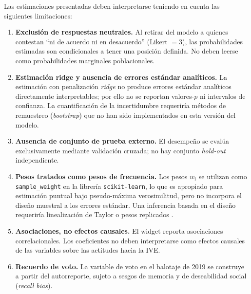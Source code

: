 \documentclass[11pt,a4paper]{article}
\begin{document}
Las estimaciones presentadas deben interpretarse teniendo en cuenta las siguientes limitaciones:
\begin{enumerate}
\setlength{\itemsep}{2pt}
\item \textbf{Exclusión de respuestas neutrales.} Al retirar del modelo a quienes contestan ``ni de acuerdo ni en desacuerdo'' (Likert $= 3$), las probabilidades estimadas son condicionales a tener una posición definida. No deben leerse como probabilidades marginales poblacionales.

\item \textbf{Estimación ridge y ausencia de errores estándar analíticos.} La estimación con penalización \emph{ridge} no produce errores estándar analíticos directamente interpretables; por ello no se reportan valores-$p$ ni intervalos de confianza. La cuantificación de la incertidumbre requeriría métodos de remuestreo (\emph{bootstrap}) que no han sido implementados en esta versión del modelo.

\item \textbf{Ausencia de conjunto de prueba externo.} El desempeño se evalúa exclusivamente mediante validación cruzada; no hay conjunto \emph{hold-out} independiente.

\item \textbf{Pesos tratados como pesos de frecuencia.} Los pesos $w_i$ se utilizan como \texttt{sample\_weight} en la librería \texttt{scikit-learn}, lo que es apropiado para estimación puntual bajo pseudo-máxima verosimilitud, pero no incorpora el diseño muestral a los errores estándar. Una inferencia basada en el diseño requeriría linealización de Taylor o pesos replicados \cite{Binder1983}.

\item \textbf{Asociaciones, no efectos causales.} El widget reporta asociaciones correlacionales. Los coeficientes no deben interpretarse como efectos causales de las variables sobre las actitudes hacia la IVE.

\item \textbf{Recuerdo de voto.} La variable de voto en el balotaje de 2019 se construye a partir del autorreporte, sujeto a sesgos de memoria y de deseabilidad social (\emph{recall bias}).
\end{enumerate}
\end{document}
